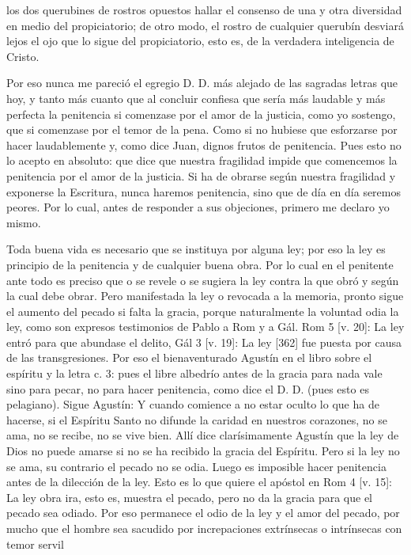 los dos querubines de rostros opuestos hallar el consenso de una y otra diversidad en medio del propiciatorio; de otro modo, el rostro de cualquier querubín desviará lejos el ojo que lo sigue del propiciatorio, esto es, de la verdadera inteligencia de Cristo.

Por eso nunca me pareció el egregio D. D. más alejado de las sagradas letras que hoy, y tanto más cuanto que al concluir confiesa que sería más laudable y más perfecta la penitencia si comenzase por el amor de la justicia, como yo sostengo, que si comenzase por el temor de la pena. Como si no hubiese que esforzarse por hacer laudablemente y, como dice Juan, dignos frutos de penitencia. Pues esto no lo acepto en absoluto: que dice que nuestra fragilidad impide que comencemos la penitencia por el amor de la justicia. Si ha de obrarse según nuestra fragilidad y exponerse la Escritura, nunca haremos penitencia, sino que de día en día seremos peores. Por lo cual, antes de responder a sus objeciones, primero me declaro yo mismo.

Toda buena vida es necesario que se instituya por alguna ley; por eso la ley es principio de la penitencia y de cualquier buena obra. Por lo cual en el penitente ante todo es preciso que o se revele o se sugiera la ley contra la que obró y según la cual debe obrar. Pero manifestada la ley o revocada a la memoria, pronto sigue el aumento del pecado si falta la gracia, porque naturalmente la voluntad odia la ley, como son expresos testimonios de Pablo a Rom y a Gál. Rom 5 [v. 20]: La ley entró para que abundase el delito, Gál 3 [v. 19]: La ley [362] fue puesta por causa de las transgresiones. Por eso el bienaventurado Agustín en el libro sobre el espíritu y la letra c. 3: pues el libre albedrío antes de la gracia para nada vale sino para pecar, no para hacer penitencia, como dice el D. D. (pues esto es pelagiano). Sigue Agustín: Y cuando comience a no estar oculto lo que ha de hacerse, si el Espíritu Santo no difunde la caridad en nuestros corazones, no se ama, no se recibe, no se vive bien. Allí dice clarísimamente Agustín que la ley de Dios no puede amarse si no se ha recibido la gracia del Espíritu. Pero si la ley no se ama, su contrario el pecado no se odia. Luego es imposible hacer penitencia antes de la dilección de la ley. Esto es lo que quiere el apóstol en Rom 4 [v. 15]: La ley obra ira, esto es, muestra el pecado, pero no da la gracia para que el pecado sea odiado. Por eso permanece el odio de la ley y el amor del pecado, por mucho que el hombre sea sacudido por increpaciones extrínsecas o intrínsecas con temor servil


